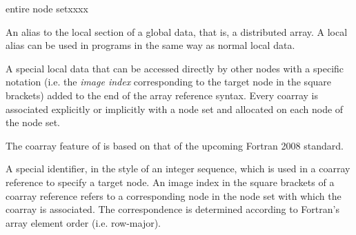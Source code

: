 \begin{namelist}{entire node setxxxx}


 An alias to the local section of a global data, that is, a distributed
 array. A local alias can be used in {\XMP} programs in the same way as
 normal local data.


 A special local data that can be accessed directly by other nodes with
 a specific notation (i.e. the {\it image index} corresponding to the
 target node in the square brackets) added to the end of the array
 reference syntax.
%
 Every coarray is associated explicitly or implicitly with a node
 set and allocated on each node of the node set.

 The coarray feature of {\XMP} is based on that of the upcoming Fortran
 2008 standard.



 A special identifier, in the style of an integer sequence, which is
 used in a coarray reference to specify a target node. An image index in
 the square brackets of a coarray reference refers to a corresponding
 node in the node set with which the coarray is associated. The
 correspondence is determined according to Fortran's array element order
 (i.e. row-major).


\end{namelist}

